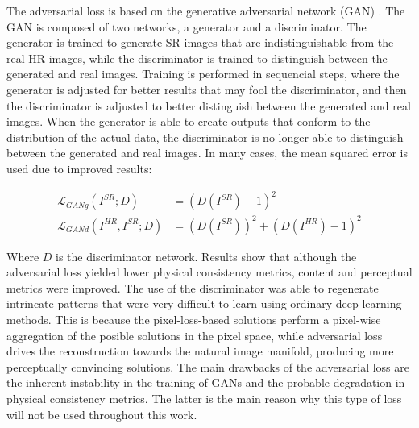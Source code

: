         The adversarial loss is based on the generative adversarial network (GAN) \cite{goodfellow2014generative}. The GAN is composed of two networks, a generator and a discriminator. The generator is trained to generate SR images that are indistinguishable from the real HR images, while the discriminator is trained to distinguish between the generated and real images. 
        Training is performed in sequencial steps, where the generator is adjusted for better results that may fool the discriminator, and then the discriminator is adjusted to better distinguish between the generated and real images.
        When the generator is able to create outputs that conform to the distribution of the actual data, the discriminator is no longer able to distinguish between the generated and real images. In many cases, the mean squared error is used due to improved results: 

        \begin{equation}
            \begin{aligned}
            \mathcal{L}_{GANg}(I^{SR};D) &= (D(I^{SR}) - 1)^2 \\ 
            \mathcal{L}_{GANd}(I^{HR}, I^{SR};D) &= (D(I^{SR}))^2 + (D(I^{HR}) - 1)^2
            \end{aligned}
        \end{equation}

        Where $D$ is the discriminator network. 
        Results show that although the adversarial loss yielded lower physical consistency metrics, content and perceptual metrics were improved. 
        The use of the discriminator was able to regenerate intrincate patterns that were very difficult to learn using ordinary deep learning methods. 
        This is because the pixel-loss-based solutions perform a pixel-wise aggregation of the posible solutions in the pixel space, while adversarial loss drives the reconstruction towards the natural image manifold, producing more perceptually convincing solutions. 
        The main drawbacks of the adversarial loss are the inherent instability in the training of GANs and the probable degradation in physical consistency metrics.
        The latter is the main reason why this type of loss will not be used throughout this work.

